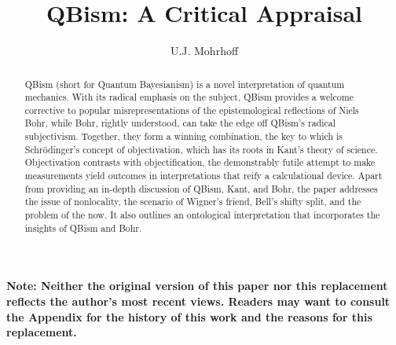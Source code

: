 \documentclass[smallextended]{svjour3}
\begin{document}
\title{QBism: A Critical Appraisal}%
\author{U.J. Mohrhoff}

\date{}
\maketitle
\vspace{-1in}
\noindent \textbf{Note: Neither the original version of this paper nor this replacement reflects the author's most recent views. Readers may want to consult the Appendix for the history of this work and the reasons for this replacement.}

\vspace{0.5in}
\begin{abstract}
QBism (short for Quantum Bayesianism) is a novel interpretation of quantum mechanics. With its radical emphasis on the subject, QBism provides a welcome corrective to popular misrepresentations of the epistemological reflections of Niels Bohr, while Bohr, rightly understood, can take the edge off QBism's radical subjectivism. Together, they form a winning combination, the key to which is Schr\"odinger's concept of objectivation, which has its roots in Kant's theory of science. Objectivation contrasts with objectification, the demonstrably futile attempt to make measurements yield outcomes in interpretations that reify a calculational device. Apart from providing an in-depth discussion of QBism, Kant, and Bohr, the paper addresses the issue of nonlocality, the scenario of Wigner's friend, Bell's shifty split, and the problem of the now. It also outlines an ontological interpretation that incorporates the insights of QBism and Bohr.
\end{abstract}%

\end{document}
